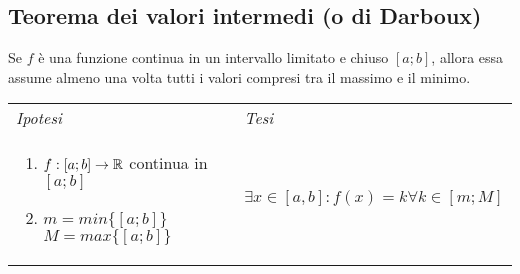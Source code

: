 \documentclass{book}     %
\begin{document}
    \subsection{Teorema dei valori intermedi (o di Darboux)}
        \begin{shadedTheorem}[Darbaux]
            Se $f$ è una funzione continua in un intervallo limitato e chiuso $[a;b]$, allora essa assume almeno una volta tutti i valori compresi tra il massimo e il minimo.
        \end{shadedTheorem}
        \begin{tabular}{m{}m{}}
            \textit{Ipotesi} & \textit{Tesi}  \\
            \begin{enumerate}
                \item $f: [a;b]\to \mathbb{R}$ continua in $[a;b]$
                \item $m=min\{[a;b]\}$ ~~~ $M=max\{[a;b]\}$
            \end{enumerate} & $\exists x \in [a,b] : f(x)=k \forall k \in [m;M]$
        \end{tabular}
\end{document}
